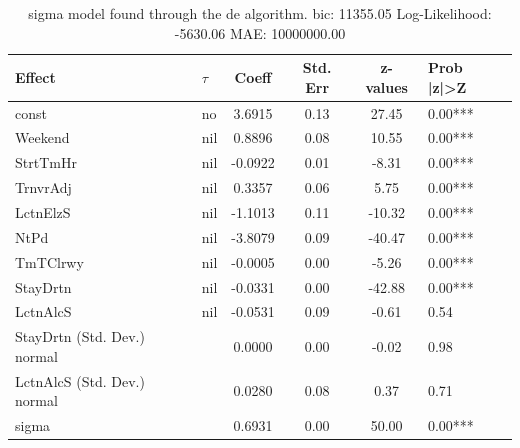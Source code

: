 \begin{table}
	\caption{sigma model found through the de algorithm. bic: 11355.05 Log-Likelihood: -5630.06 MAE: 10000000.00}
	\begin{center}
		\begin{tabular}{|l|l|c|c|c|l|}
			\hline
			Effect & $\tau$ & Coeff & Std. Err & z-values & Prob |z|>Z \\
			\hline
			const & no & 3.6915 & 0.13 & 27.45 & 0.00*** \\
			\hline
			Weekend & nil & 0.8896 & 0.08 & 10.55 & 0.00*** \\
			\hline
			StrtTmHr & nil & -0.0922 & 0.01 & -8.31 & 0.00*** \\
			\hline
			TrnvrAdj & nil & 0.3357 & 0.06 & 5.75 & 0.00*** \\
			\hline
			LctnElzS & nil & -1.1013 & 0.11 & -10.32 & 0.00*** \\
			\hline
			NtPd & nil & -3.8079 & 0.09 & -40.47 & 0.00*** \\
			\hline
			TmTClrwy & nil & -0.0005 & 0.00 & -5.26 & 0.00*** \\
			\hline
			StayDrtn & nil & -0.0331 & 0.00 & -42.88 & 0.00*** \\
			\hline
			LctnAlcS & nil & -0.0531 & 0.09 & -0.61 & 0.54 \\
			\hline
			StayDrtn (Std. Dev.) normal &  & 0.0000 & 0.00 & -0.02 & 0.98 \\
			\hline
			LctnAlcS (Std. Dev.) normal &  & 0.0280 & 0.08 & 0.37 & 0.71 \\
			\hline
			sigma &  & 0.6931 & 0.00 & 50.00 & 0.00*** \\
			\hline
		\end{tabular}
	\end{center}
\end{table}